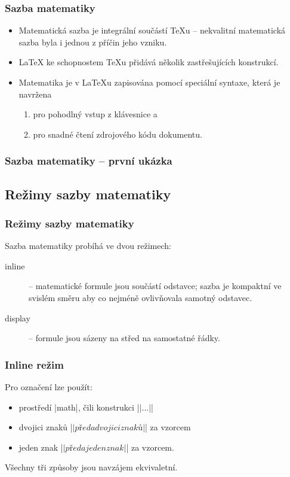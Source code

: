 \begin{frame}
	\frametitle{Sazba matematiky}
	\begin{itemize}
		\item Matematická sazba je integrální součástí \TeX{}u -- nekvalitní matematická sazba byla i jednou z příčin jeho vzniku.
		\item \LaTeX{} ke schopnostem \TeX{}u přidává několik zastřešujících konstrukcí.
		\item Matematika je v \LaTeX{}u zapisována pomocí speciální syntaxe, která je navržena
			\begin{enumerate}
				\item pro pohodlný vstup z klávesnice a
				\item pro snadné čtení zdrojového kódu dokumentu.
			\end{enumerate}
	\end{itemize}
\end{frame}


\begin{frame}
	\frametitle{Sazba matematiky -- první ukázka}
\end{frame}


\subsection{Režimy sazby matematiky}
\begin{frame}
	\frametitle{Režimy sazby matematiky}
	Sazba matematiky probíhá ve dvou režimech:
	\begin{description}
		\item [inline] -- matematické formule jsou součástí odstavce; sazba je kompaktní ve svislém směru aby co nejméně ovlivňovala samotný odstavec.
		\item [display] -- formule jsou sázeny na střed na samostatné řádky.
	\end{description}
\end{frame}


\begin{frame}[fragile]
	\frametitle{Inline režim}
	Pro označení lze použít:
	\begin{itemize}
		\item prostředí |math|, čili konstrukci |\begin{math}|\ldots|\end{math}|
		\item dvojici znaků |\(| před a dvojici znaků |\)| za vzorcem
		\item jeden znak |$| před a jeden znak |$| za vzorcem.
	\end{itemize}
	Všechny tři způsoby jsou navzájem ekvivaletní.
\end{frame}


